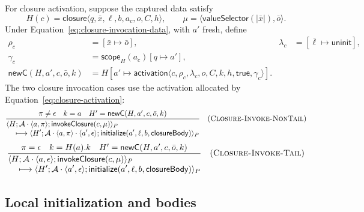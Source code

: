 \documentclass[11pt]{article}
\numberwithin{equation}{section}
\newcommand{\kw}[1]{\ensuremath{\mathsf{#1}}}
\newcommand{\rulelabel}[1]{\textsc{#1}}
\begin{document}
For closure activation, suppose the captured data satisfy
\begin{equation}\label{eq:closure-invocation-data}
 H(c)=\kw{closure}\langle q,\bar x,\ell,b,a_c,o,C,h\rangle,
 \qquad
 \mu=\langle\mathsf{valueSelector}(|\bar x|),\bar o\rangle.
\end{equation}
Under Equation~\eqref{eq:closure-invocation-data}, with $a'$ fresh, define
\begin{equation}\label{eq:closure-activation}
\begin{aligned}
 \rho_c&=[\bar x\mapsto\bar o],&
 \lambda_c&=[\bar\ell\mapsto\kw{uninit}],\\
 \gamma_c&=\mathsf{scope}_H(a_c)[q\mapsto a'],\\
 \mathsf{newC}(H,a',c,\bar o,k)
   &=H[a'\mapsto\kw{activation}\langle
       c,\rho_c,\lambda_c,o,C,k,h,\kw{true},\gamma_c\rangle].
\end{aligned}
\end{equation}
The two closure invocation cases use the activation allocated by
Equation~\eqref{eq:closure-activation}:
\[
\dfrac{\pi\ne\epsilon\quad k=a\quad
       H'=\mathsf{newC}(H,a',c,\bar o,k)}
 {\begin{aligned}
  &\langle H;\mathcal A\cdot\langle a,\pi\rangle;
      \kw{invokeClosure}(c,\mu)\rangle_P\\[-1mm]
  &\quad\longmapsto
   \langle H';\mathcal A\cdot\langle a,\pi\rangle
                    \cdot\langle a',\epsilon\rangle;
      \kw{initialize}(a',\ell,b,\kw{closureBody})\rangle_P
  \end{aligned}}
\quad(\rulelabel{Closure-Invoke-NonTail})
\]
\[
\dfrac{\pi=\epsilon\quad k=H(a).k\quad
       H'=\mathsf{newC}(H,a',c,\bar o,k)}
 {\begin{aligned}
  &\langle H;\mathcal A\cdot\langle a,\epsilon\rangle;
      \kw{invokeClosure}(c,\mu)\rangle_P\\[-1mm]
  &\quad\longmapsto
   \langle H';\mathcal A\cdot\langle a',\epsilon\rangle;
      \kw{initialize}(a',\ell,b,\kw{closureBody})\rangle_P
  \end{aligned}}
\quad(\rulelabel{Closure-Invoke-Tail})
\]

\subsection{Local initialization and bodies}
\end{document}
